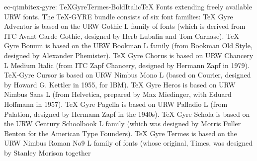 \documentclass{ddltxtyp}
\begin{document}
\begin{package}{ec-qtmbi}{tex-gyre: TeXGyreTermes-BoldItalic}{{\TeX} Fonts extending freely available URW fonts.}
The {\TeX}-GYRE bundle consists of six font families: {\TeX} Gyre
Adventor is based on the URW Gothic L family of fonts (which is
derived from ITC Avant Garde Gothic, designed by Herb Lubalin
and Tom Carnase). {\TeX} Gyre Bonum is based on the URW Bookman L
family (from Bookman Old Style, designed by Alexander
Phemister). {\TeX} Gyre Chorus is based on URW Chancery L Medium
Italic (from ITC Zapf Chancery, designed by Hermann Zapf in
1979). {\TeX}-Gyre Cursor is based on URW Nimbus Mono L (based on
Courier, designed by Howard G. Kettler in 1955, for IBM). {\TeX}
Gyre Heros is based on URW Nimbus Sans L (from Helvetica,
prepared by Max Miedinger, with Eduard Hoffmann in 1957). {\TeX}
Gyre Pagella is based on URW Palladio L (from Palation,
designed by Hermann Zapf in the 1940s). {\TeX} Gyre Schola is
based on the URW Century Schoolbook L family (which was
designed by Morris Fuller Benton for the American Type
Founders). {\TeX} Gyre Termes is based on the URW Nimbus Roman No9
L family of fonts (whose original, Times, was designed by
Stanley Morison together %
\end{package}
\end{document}
